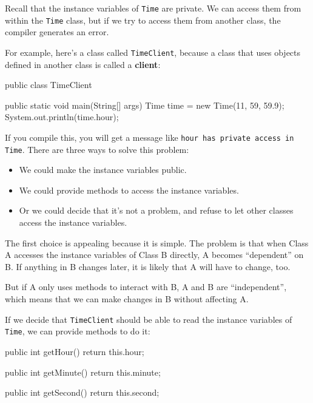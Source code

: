 \documentclass[12pt]{book}
\theoremstyle{exercise}
\newcommand{\java}[1]{\verb"#1"}
\newcommand{\java}[1]{\lstinline{#1}} %
\begin{document}
Recall that the instance variables of \java{Time} are private.
We can access them from within the \java{Time} class, but if we try to access them from another class, the compiler generates an error.


For example, here's a class called \java{TimeClient}, because a class that uses objects defined in another class is called a {\bf client}:


\begin{code}
public class TimeClient {

    public static void main(String[] args) {
        Time time = new Time(11, 59, 59.9);
        System.out.println(time.hour);
    }
}
\end{code}

If you compile this, you will get a message like \java{hour has private access in Time}.
There are three ways to solve this problem:

\begin{itemize}

\item We could make the instance variables public.

\item We could provide methods to access the instance variables.

\item Or we could decide that it's not a problem, and refuse to let other classes access the instance variables.

\end{itemize}

The first choice is appealing because it is simple.
The problem is that when Class A accesses the instance variables of Class B directly, A becomes ``dependent'' on B.
If anything in B changes later, it is likely that A will have to change, too.


But if A only uses methods to interact with B, A and B are ``independent'', which means that we can make changes in B without affecting A.

If we decide that \java{TimeClient} should be able to read the instance variables of \java{Time}, we can provide methods to do it:

\begin{code}
    public int getHour() {
        return this.hour;
    }

    public int getMinute() {
        return this.minute;
    }

    public int getSecond() {
        return this.second;
    }
\end{code}
\end{document}
